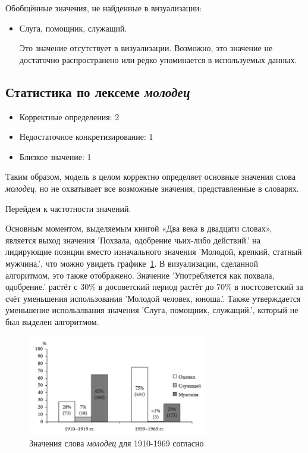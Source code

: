 Обобщённые значения, не найденные в визуализации:

\begin{itemize}
    \item Слуга, помощник, служащий.

    Это значение отсутствует в визуализации.
    Возможно, это значение не достаточно распространено или редко упоминается в используемых данных.
\end{itemize}

\subsection*{Статистика по лексеме \textit{молодец}}
\begin{itemize}
    \item Корректные определения: 2
    \item Недостаточное конкретизирование: 1
    \item Близкое значение: 1
\end{itemize}

Таким образом, модель в целом корректно определяет основные значения слова \textit{молодец},
но не охватывает все возможные значения, представленные в словарях.

Перейдем к частотности значений.

Основным моментом, выделяемым книгой «Два века в двадцати словах», является
выход значения ’Похвала, одобрение чьих-либо действий.’ на лидирующие позиции
вместо изначального значения ’Молодой, крепкий, статный мужчина.’, что можно увидеть
графике~\ref{fig:TwoCenturiesMolodets}.
В визуализации, сделанной алгоритмом, это также отображено.
Значение ’Употребляется как похвала, одобрение.’ растёт с 30\% в досоветский период
растёт до 70\% в постсоветский за счёт уменьшения использования ’Молодой человек, юноша.’.
Также утверждается уменьшение использлвания значения ’Слуга, помощник, служащий.’,
который не был выделен алгоритмом.

\begin{figure}[H]
    \centering %
    \includegraphics[width=0.7\textwidth]{img/book/molodets/1910-1969}
    \caption{Значения слова \textit{молодец} для 1910-1969 согласно~\cite{TwoCenturies}}
    \label{fig:TwoCenturiesMolodets}
\end{figure}

